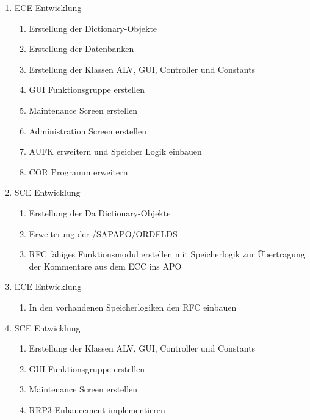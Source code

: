 \begin{enumerate}[itemsep=0em,partopsep=0em,parsep=0em,topsep=0em]
	\item ECE Entwicklung
	\begin{enumerate}
		\item Erstellung der Dictionary-Objekte
		\item Erstellung der Datenbanken
		\item Erstellung der Klassen ALV, GUI, Controller und Constants
		\item GUI Funktionsgruppe erstellen
		\item Maintenance Screen erstellen
		\item Administration Screen erstellen
		\item AUFK erweitern und Speicher Logik einbauen
		\item COR Programm erweitern
	\end{enumerate}
	\item SCE Entwicklung
	\begin{enumerate}
		\item Erstellung der Da Dictionary-Objekte
		\item Erweiterung der /SAPAPO/ORDFLDS
		\item RFC fähiges Funktionsmodul erstellen mit Speicherlogik zur Übertragung der Kommentare   aus dem ECC ins APO
	\end{enumerate}
	\item ECE Entwicklung
	\begin{enumerate}
		\item In den vorhandenen Speicherlogiken den RFC einbauen
	\end{enumerate}
	\item SCE Entwicklung
	\begin{enumerate}
		\item Erstellung der Klassen ALV, GUI, Controller und Constants
		\item GUI Funktionsgruppe erstellen
		\item Maintenance Screen erstellen
		\item RRP3 Enhancement implementieren
	\end{enumerate}
\end{enumerate}
